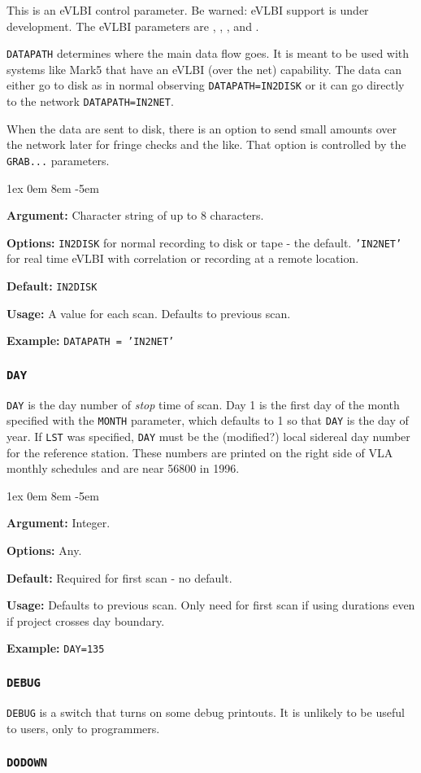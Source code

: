\documentclass{report}
\newcommand{\rcwbox}[5]{
  \begin{list}{}{\parsep 1ex  \itemsep 0em
                 \leftmargin 8em  \itemindent -5em }
    \item {\bf Argument:} #1
    \item {\bf Options:}  #2
    \item {\bf Default:}  #3
    \item {\bf Usage:}    #4
    \item {\bf Example:}  #5
  \end{list}
}
\begin{document}
This is an eVLBI control parameter.  Be warned: eVLBI support is
under development.
The eVLBI parameters are ,
, ,
and .

{\tt DATAPATH} determines where the main data flow goes.  It is meant to
be used with systems like Mark5 that have an eVLBI (over the net)
capability.  The data can either go to disk as in normal observing
{\tt DATAPATH=IN2DISK} or it can go directly to the network
{\tt DATAPATH=IN2NET}.

When the data are sent to disk, there is an option to send small amounts
over the network later for fringe checks and the like.  That option is
controlled by the {\tt GRAB...} parameters.

\rcwbox
{ Character string of up to 8 characters.}
{  {\tt IN2DISK} for normal recording to disk or tape - the default.
{\tt 'IN2NET'} for real time eVLBI with correlation or recording
at a remote location.}
{{\tt IN2DISK}}
{A value for each scan.  Defaults to previous scan.}
{{\tt DATAPATH = 'IN2NET' }}


\subsubsection{\label{MP:DAY}{\tt DAY}}

{\tt DAY} is the day number of {\em stop} time of scan. Day 1
is the first day of the month specified with the {\tt MONTH}
parameter, which defaults to 1 so that {\tt DAY} is the day of
year. If {\tt LST} was specified, {\tt DAY} must be the (modified?)
local sidereal day number for the reference station. These numbers are
printed on the right side of VLA monthly schedules and are near 56800
in 1996.

\rcwbox
{Integer.}
{Any.}
{Required for first scan - no default.}
{Defaults to previous scan. Only need for first scan if using
durations even if project crosses day boundary.}
{{\tt DAY=135}}


\subsubsection{\label{MP:DEBUG}{\tt DEBUG}}

{\tt DEBUG} is a switch that turns on some debug printouts.  It is
unlikely to be useful to users, only to programmers.


\subsubsection{\label{MP:DODOWN}{\tt DODOWN}}
\end{document}
